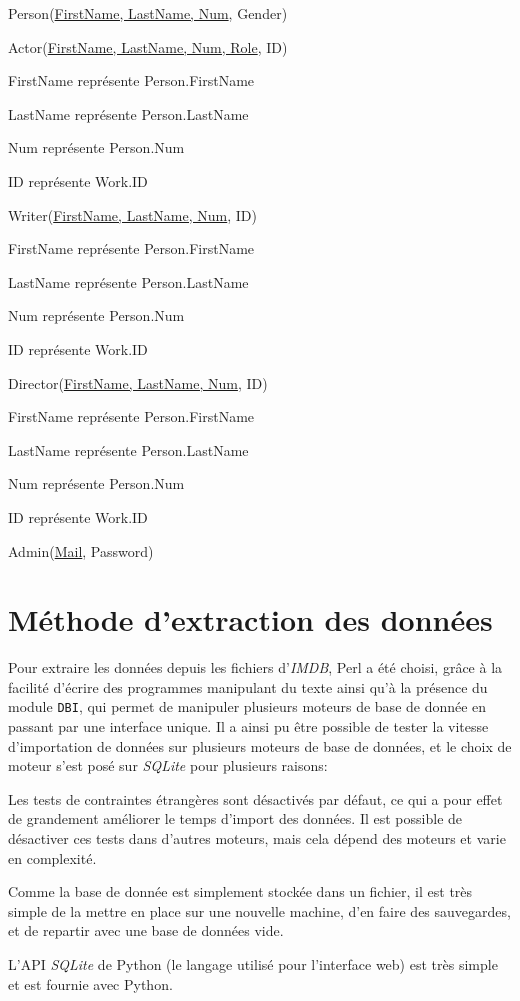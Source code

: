 \documentclass[a4paper,12pt]{article}
\begin{document}
Person(\underline{FirstName, LastName, Num}, Gender)

Actor(\underline{FirstName, LastName, Num, Role}, ID)
\begin{list}{-}{}
  \item FirstName représente Person.FirstName
  \item LastName représente Person.LastName
  \item Num représente Person.Num
  \item ID représente Work.ID
\end{list}

Writer(\underline{FirstName, LastName, Num}, ID)
\begin{list}{-}{}
  \item FirstName représente Person.FirstName
  \item LastName représente Person.LastName
  \item Num représente Person.Num
  \item ID représente Work.ID
\end{list}

Director(\underline{FirstName, LastName, Num}, ID)
\begin{list}{-}{}
  \item FirstName représente Person.FirstName
  \item LastName représente Person.LastName
  \item Num représente Person.Num
  \item ID représente Work.ID
\end{list}

Admin(\underline{Mail}, Password)
\section{Méthode d'extraction des données}
Pour extraire les données depuis les fichiers d'\emph{IMDB}, Perl a
été choisi, grâce à la facilité d'écrire des programmes manipulant du
texte ainsi qu'à la présence du module \texttt{DBI}, qui permet de
manipuler plusieurs moteurs de base de donnée en passant par une
interface unique. Il a ainsi pu être possible de tester la vitesse
d'importation de données sur plusieurs moteurs de base de données, et
le choix de moteur s'est posé sur \emph{SQLite} pour plusieurs
raisons:

\begin{list}{-}{}
  \item Les tests de contraintes étrangères sont désactivés par
    défaut, ce qui a pour effet de grandement améliorer le temps
    d'import des données. Il est possible de désactiver ces tests dans
    d'autres moteurs, mais cela dépend des moteurs et varie en
    complexité.
  \item Comme la base de donnée est simplement stockée dans un
    fichier, il est très simple de la mettre en place sur une nouvelle
    machine, d'en faire des sauvegardes, et de repartir avec une base
    de données vide.
  \item L'API \emph{SQLite} de Python (le langage utilisé pour
    l'interface web) est très simple et est fournie avec Python.
\end{list}
\end{document}

